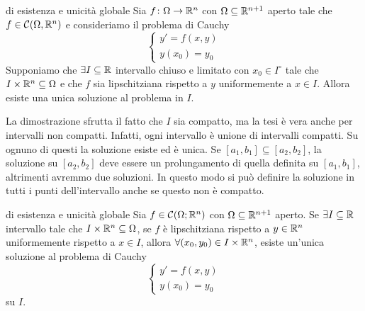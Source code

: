\documentclass[a4paper]{article}
\begin{document}
\begin{radioactive}
\begin{snippettheorem}{di esistenza e unicità globale}
    Sia \(f\colon \Omega \to \mathbb{R}^n\) con \(\Omega \subseteq \mathbb{R}^{n+1}\) aperto
    tale che \(f \in \mathcal C(\Omega, \mathbb{R}^n)\)
    e consideriamo il problema di Cauchy
    \[
        \begin{cases}
            y' = f(x,y) \\
            y(x_0) = y_0
        \end{cases}
    \]
    Supponiamo che \(\exists I \subseteq \mathbb{R}\) intervallo
    chiuso e limitato con \(x_0 \in I^\circ\) tale che \(I \times \mathbb{R}^n \subseteq \Omega\) e che \(f\)
    sia lipschitziana rispetto a \(y\) uniformemente a \(x\in I\). Allora esiste una unica soluzione al problema in \(I\).
\end{snippettheorem}
\end{radioactive}

\begin{radioactive}
La dimostrazione sfrutta il fatto che \(I\) sia compatto, ma la tesi è vera anche per intervalli non compatti.
Infatti, ogni intervallo è unione di intervalli compatti.
Su ognuno di questi la soluzione esiste ed è unica.
Se \([a_1, b_1] \subseteq [a_2, b_2]\), la soluzione su \([a_2, b_2]\) deve essere un prolungamento
di quella definita su \([a_1, b_1]\), altrimenti avremmo due soluzioni.
In questo modo si può definire la soluzione in tutti i punti
dell'intervallo anche se questo non è compatto.
\end{radioactive}

\begin{radioactive}
\begin{snippettheorem}{di esistenza e unicità globale}
    Sia \(f \in \mathcal C(\Omega; \mathbb{R}^n)\) con \(\Omega \subseteq \mathbb{R}^{n+1}\) aperto.
    Se \(\exists I \subseteq \mathbb{R}\) intervallo tale che
    \(I \times \mathbb{R}^n \subseteq \Omega\), se \(f\) è lipschitziana rispetto a \(y \in \mathbb{R}^n\) uniformemente
    rispetto a \(x\in I\), allora \(\forall (x_0, y_0) \in I \times \mathbb{R}^n\),
    esiste un'unica soluzione al problema di Cauchy
    \[
        \begin{cases}
            y' = f(x,y) \\
            y(x_0) = y_0
        \end{cases}
    \]
    su \(I\).
\end{snippettheorem}
\end{radioactive}
\end{document}
